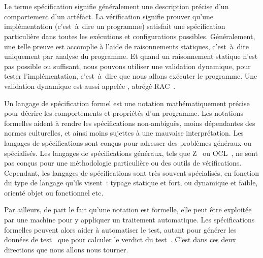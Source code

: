 \section{}
\label{section:sota:bisl}

Le terme {\strong spécification} signifie généralement une description précise
d'un comportement d'un artéfact. La {\strong vérification} signifie prouver
qu'une implémentation (c'est~à~dire un programme) satisfait une spécification
particulière dans toutes les exécutions et configurations possibles.
Généralement, une telle preuve est accomplie à l'aide de raisonnements
statiques, c'est~à~dire uniquement par analyse du programme. Et quand un
raisonnement statique n'est pas possible ou suffisant, nous pouvons utiliser une
{\strong validation} dynamique, pour tester l'implémentation, c'est~à~dire que
nous allons exécuter le programme. Une validation dynamique est aussi appelée
, abrégé RAC~.

Un {\strong langage de spécification} formel est une notation mathématiquement
précise pour décrire les comportements et propriétés d'un programme. Les
{\strong notations formelles} aident à rendre les spécifications non-ambiguës,
moins dépendantes des normes culturelles, et ainsi moins sujettes à une mauvaise
interprétation. Les langages de spécifications sont conçus pour adresser des
problèmes généraux ou spécialisés. Les langages de spécifications généraux, tels
que Z~ ou OCL~, ne sont pas conçus pour une
méthodologie particulière ou des outils de vérifications. Cependant, les
langages de spécifications sont très souvent spécialisés, en fonction du type de
langage qu'ils visent~: typage statique et fort, ou dynamique et faible, orienté
objet ou fonctionnel etc.

Par ailleurs, de part le fait qu'une notation est formelle, elle peut être
exploitée par une machine pour y appliquer un traitement automatique.  Les
spécifications formelles peuvent alors aider à {\strong automatiser le test},
autant pour générer les données de test~ que pour calculer le verdict du test~.  C'est dans ces
deux directions que nous allons nous tourner.

